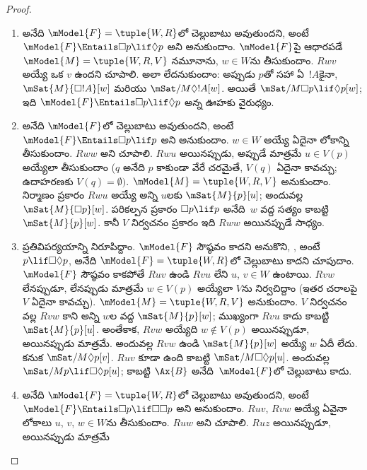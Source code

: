 \documentclass[../../../include/open-logic-section]{subfiles}
\begin{document}
\begin{proof}
  \begin{enumerate}
  \item {} అనేది $\mModel{F} = \tuple{W, R}$లో
    చెల్లుబాటు అవుతుందని, అంటే
    $\mModel{F} \Entails \Box p \lif \Diamond p$ అని
    అనుకుందాం. $\mModel{F}$పై ఆధారపడే
    $\mModel{M} = \tuple{W, R, V}$ నమూనాను, $w \in W$ను
    తీసుకుందాం. $Rwv$ అయ్యే ఒక $v$ ఉందని చూపాలి.
    అలా లేదనుకుందాం: అప్పుడు $p$తో సహా ఏ~$!A$కైనా,
    $\mSat{M}{\Box !A}[w]$ మరియు
    $\mSat/{M}{\Diamond !A}[w]$.
    అయితే $\mSat/{M}{\Box p \lif
      \Diamond p}[w]$; ఇది $\mModel{F}
    \Entails \Box p \lif \Diamond p$ అన్న ఊహకు వైరుధ్యం.
  \item {} అనేది $\mModel{F}$లో చెల్లుబాటు
    అవుతుందని, అంటే $\mModel{F} \Entails \Box
    p \lif p$ అని అనుకుందాం. $w \in W$ అయ్యే ఏదైనా లోకాన్ని
    తీసుకుందాం. $Rww$ అని చూపాలి. $Rwu$
    అయినప్పుడు, అప్పుడే మాత్రమే $u \in V(p)$ అయ్యేలా తీసుకుందాం
    ($q$ అనేది $p$ కాకుండా వేరే చరమైతే, $V(q)$
    ఏదైనా కావచ్చు; ఉదాహరణకు $V(q) = \emptyset)$.
    $\mModel{M} = \tuple{W, R, V}$ అనుకుందాం.
    నిర్మాణం ప్రకారం $Rwu$ అయ్యే అన్ని $u$లకు
    $\mSat{M}{p}[u]$; అందువల్ల
    $\mSat{M}{\Box p}[w]$. పరికల్పన ప్రకారం $\Box p \lif p$
    అనేది~$w$ వద్ద సత్యం కాబట్టి $\mSat{M}{p}[w]$.
    కానీ $V$ నిర్వచనం ప్రకారం ఇది $Rww$ అయినప్పుడే
    సాధ్యం.
  \item ప్రతివిపర్యయాన్ని నిరూపిద్దాం. $\mModel{F}$
    సౌష్ఠవం కాదని అనుకొని, , అంటే
    $p \lif \Box\Diamond p$, అనేది
    $\mModel{F}= \tuple{W, R}$లో చెల్లుబాటు కాదని
    చూపుదాం. $\mModel{F}$ సౌష్ఠవం కాకపోతే
    $Ruv$ ఉండి $Rvu$ లేని $u$, $v \in W$
    ఉంటాయి. $Rvw$ లేనప్పుడూ, లేనప్పుడు మాత్రమే $w \in V(p)$
    అయ్యేలా $V$ను నిర్వచిద్దాం (ఇతర చరాలపై
    $V$ ఏదైనా కావచ్చు). $\mModel{M} =\tuple{W, R,
      V}$ అనుకుందాం. $V$ నిర్వచనం వల్ల $Rvw$
    కాని అన్ని $w$ల వద్ద $\mSat{M}{p}[w]$;
    ముఖ్యంగా $Rvu$ కాదు కాబట్టి $\mSat{M}{p}[u]$.
    అంతేకాక, $Rvw$ అయ్యేది
    $w \notin V(p)$ అయినప్పుడూ, అయినప్పుడు మాత్రమే. అందువల్ల $Rvw$ ఉండి
    $\mSat{M}{p}[w]$ అయ్యే $w$ ఏదీ లేదు.
    కనుక $\mSat/{M}{\Diamond p}[v]$. $Ruv$
    కూడా ఉంది కాబట్టి
    $\mSat/{M}{\Box\Diamond p}[u]$.
    అందువల్ల $\mSat/{M}{p \lif
      \Box\Diamond p}[u]$; కాబట్టి $\Ax{B}$
    అనేది~$\mModel{F}$లో చెల్లుబాటు కాదు.
  \item {} అనేది $\mModel{F} = \tuple{W,R}$లో
    చెల్లుబాటు అవుతుందని, అంటే
    $\mModel{F} \Entails \Box p \lif \Box\Box p$ అని
    అనుకుందాం. $Ruv$, $Rvw$ అయ్యే ఏవైనా
    లోకాలు $u$, $v$, $w \in W$ను తీసుకుందాం.
    $Ruw$ అని చూపాలి. $Ruz$ అయినప్పుడూ, అయినప్పుడు మాత్రమే

\end{enumerate}
\end{proof}
\end{document}
